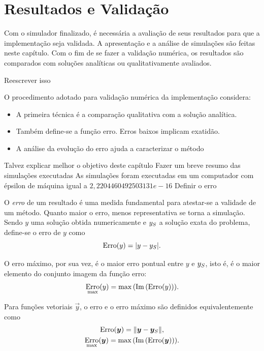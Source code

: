 \chapter{Resultados e Validação} \label{ch:results}

Com o simulador finalizado, é necessária a avaliação de seus resultados para que a implementação seja validada. A apresentação e a análise de simulações são feitas neste capítulo. Com o fim de se fazer a validação numérica, os resultados são comparados com soluções analíticas ou qualitativamente avaliados.

\alert{Reescrever isso}

O procedimento adotado para validação numérica da implementação considera:
\begin{itemize}
	\item \alert{A primeira técnica é a comparação qualitativa com a solução analítica. }
	\item \alert{Também define-se a função erro. Erros baixos implicam exatidão.}
	\item \alert{A análise da evolução do erro ajuda a caracterizar o método}
\end{itemize}

\alert{Talvez explicar melhor o objetivo deste capítulo}
\alert{Fazer um breve resumo das simulações executadas}
\alert{As simulações foram executadas em um computador com épsilon de máquina igual a \(2,2204460492503131e-16\)}
\alert{Definir o erro}

O \textit{erro} de um resultado é uma medida fundamental para atestar-se a validade de um método. Quanto maior o erro, menos representativa se torna a simulação. Sendo \(y\) uma solução obtida numericamente e \(y_S\) a solução exata do problema, define-se o erro de \(y\) como
\begin{equation*}
	\errorOf{y} = \abs{y - \analytical{y}}.
\end{equation*}

O erro máximo, por sua vez, é o maior erro pontual entre \(y\) e \(y_S\), isto é, é o maior elemento do conjunto imagem da função erro:
\begin{equation*}
	\maximumErrorOf{y} = \max\pqty{\Im\pqty{\errorOf{y}}}.
\end{equation*}

Para funções vetoriais \(\vec{y}\), o erro e o erro máximo são definidos equivalentemente como
\begin{gather}
	\errorOf{\vec{y}} = \norm{\vec{y} - \analytical{\vec{y}}}, \label{eq:vector_error} \\
	\maximumErrorOf{\vec{y}} = \max\pqty{\Im\pqty{\errorOf{\vec y}}}. \label{eq:maximum_vector_error}
\end{gather}

